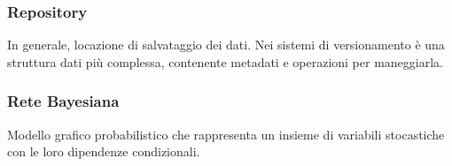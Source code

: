 \subsubsection*{Repository}
In generale, locazione di salvataggio dei dati. Nei sistemi di versionamento è una struttura dati più complessa, contenente metadati e operazioni per maneggiarla.

\subsubsection*{Rete Bayesiana}
Modello grafico probabilistico che rappresenta un insieme di variabili stocastiche con le loro dipendenze condizionali.
